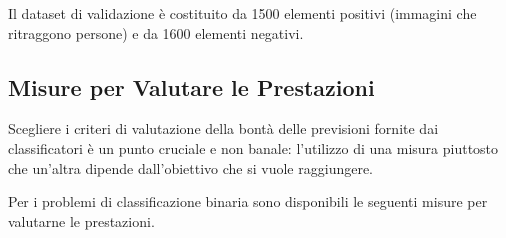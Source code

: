             Il dataset di validazione è costituito da 1500 elementi positivi (immagini che ritraggono persone) e da 1600 elementi negativi.

        \subsection{Misure per Valutare le Prestazioni} %
        \label{sub:misure_per_valutare_le_prestazioni}
            Scegliere i criteri di valutazione della bontà delle previsioni fornite dai classificatori è un punto cruciale e non banale: l'utilizzo di una misura piuttosto che un'altra dipende dall'obiettivo che si vuole raggiungere.

            Per i problemi di classificazione binaria sono disponibili le seguenti misure per valutarne le prestazioni.
